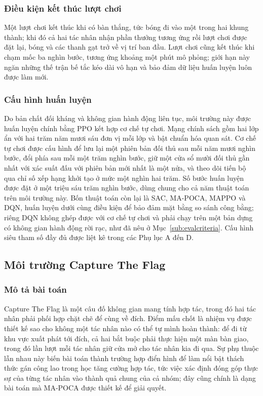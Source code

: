 \subsubsection{Điều kiện kết thúc lượt chơi}
\indent Một lượt chơi kết thúc khi có bàn thắng, tức bóng đi vào một trong hai khung
thành; khi đó cả hai tác nhân nhận phần thưởng tương ứng rồi lượt chơi được đặt lại,
bóng và các thanh gạt trở về vị trí ban đầu. Lượt chơi cũng kết thúc khi chạm mốc ba
nghìn bước, tương ứng khoảng một phút mô phỏng; giới hạn này ngăn những thế trận bế tắc
kéo dài vô hạn và bảo đảm dữ liệu huấn luyện luôn được làm mới.

\subsubsection{Cấu hình huấn luyện}
\indent Do bản chất đối kháng và không gian hành động liên tục, môi trường này được
huấn luyện chính bằng PPO kết hợp cơ chế tự chơi. Mạng chính sách gồm hai lớp ẩn với
hai trăm năm mươi sáu đơn vị mỗi lớp và bật chuẩn hóa quan sát. Cơ chế tự chơi được cấu
hình để lưu lại một phiên bản đối thủ sau mỗi năm mươi nghìn bước, đổi phía sau mỗi một
trăm nghìn bước, giữ một cửa sổ mười đối thủ gần nhất với xác suất đấu với phiên bản
mới nhất là một nửa, và theo dõi tiến bộ qua chỉ số xếp hạng khởi tạo ở mức một nghìn
hai trăm. Số bước huấn luyện được đặt ở một triệu sáu trăm nghìn bước, dùng chung cho cả
năm thuật toán trên môi trường này. Bốn thuật toán còn lại là SAC, MA-POCA, MAPPO và
DQN, huấn luyện dưới cùng điều kiện để bảo đảm mặt bằng so sánh công bằng; riêng DQN
không ghép được với cơ chế tự chơi và phải chạy trên một bản dựng có không gian hành
động rời rạc, như đã nêu ở Mục~\ref{sub:evalcriteria}. Cấu hình siêu tham số đầy đủ được
liệt kê trong các Phụ lục A đến D.

\subsection{Môi trường Capture The Flag}
\label{sub:env-coop}

\subsubsection{Mô tả bài toán}
\indent Capture The Flag là một câu đố không gian mang tính hợp tác, trong đó hai tác
nhân phải phối hợp chặt chẽ để cùng về đích. Điểm mấu chốt là nhiệm vụ được thiết kế
sao cho không một tác nhân nào có thể tự mình hoàn thành: để đi từ khu vực xuất
phát tới đích, cả hai bắt buộc phải thực hiện một màn bàn giao, trong đó lần lượt mỗi
tác nhân giữ cửa mở cho tác nhân kia đi qua. Sự phụ thuộc lẫn nhau này biến bài toán
thành trường hợp điển hình để làm nổi bật thách thức gán công lao trong học tăng cường
hợp tác, tức việc xác định đóng góp thực sự của từng tác nhân vào thành quả chung của
cả nhóm; đây cũng chính là dạng bài toán mà MA-POCA được thiết kế để giải quyết.

